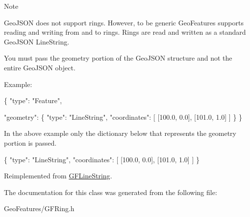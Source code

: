 \begin{DoxyNote}{Note}


Geo\+J\+S\+O\+N does not support rings. However, to be generic Geo\+Features supports reading and writing from and to rings. Rings are read and written as a standard Geo\+J\+S\+O\+N Line\+String.

You must pass the geometry portion of the Geo\+J\+S\+O\+N structure and not the entire Geo\+J\+S\+O\+N object.

Example\+:


\begin{DoxyCode}
\{
      \textcolor{stringliteral}{"type"}: \textcolor{stringliteral}{"Feature"},

      \textcolor{stringliteral}{"geometry"}: \{ \textcolor{stringliteral}{"type"}: \textcolor{stringliteral}{"LineString"},
                    \textcolor{stringliteral}{"coordinates"}: [ [100.0, 0.0], [101.0, 1.0] ]
                  \}
 \}
\end{DoxyCode}


In the above example only the dictionary below that represents the geometry portion is passed.


\begin{DoxyCode}
\{
      \textcolor{stringliteral}{"type"}: \textcolor{stringliteral}{"LineString"},
      \textcolor{stringliteral}{"coordinates"}: [ [100.0, 0.0], [101.0, 1.0] ]
\}
\end{DoxyCode}
 
\end{DoxyNote}


Reimplemented from \hyperlink{interface_g_f_line_string_affe0307951a95edbf4b35092fc1b92ed}{G\+F\+Line\+String}.



The documentation for this class was generated from the following file\+:\begin{DoxyCompactItemize}
\item 
Geo\+Features/G\+F\+Ring.\+h\end{DoxyCompactItemize}
